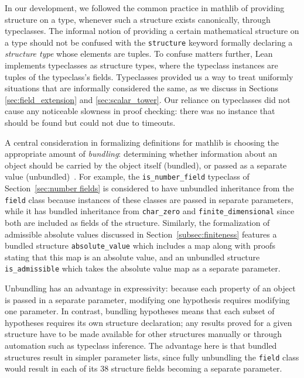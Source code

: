 \documentclass[sn-mathphys]{sn-jnl}%
\newcommand{\lean}[1]{\texttt{#1}\xspace}
\newcommand{\mathlib}{\textsf{mathlib}\xspace}
\begin{document}
In our development, we followed the common practice in \mathlib of providing structure on a type,
whenever such a structure exists canonically, through typeclasses.
The informal notion of providing a certain mathematical structure on a type should not be confused with the \lean{structure} keyword formally declaring a \emph{structure type} whose elements are tuples.
To confuse matters further, Lean implements typeclasses as structure types, where the typeclass instances are tuples of the typeclass's fields.
Typeclasses provided us a way to treat uniformly situations that are informally considered the same, as we discuss in Sections \ref{sec:field_extension} and \ref{sec:scalar_tower}.
Our reliance on typeclasses did not cause any noticeable slowness in proof checking:
there was no instance that should be found but could not due to timeouts.

A central consideration in formalizing definitions for \mathlib is choosing the appropriate amount of \emph{bundling}:
determining whether information about an object should be carried by the object itself (bundled), or passed as a separate value (unbundled)~\cite{instance-parameters-mathlib}.
For example, the \lean{is\_number\_field} typeclass of Section~\ref{sec:number fields} is considered to have unbundled inheritance from the \lean{field} class because instances of these classes are passed in separate parameters,
while it has bundled inheritance from \lean{char\_zero} and \lean{finite\_dimensional} since both are included as fields of the structure.
Similarly, the formalization of admissible absolute values discussed in Section~\ref{subsec:finiteness} features a bundled structure \lean{absolute\_value} which includes a map along with proofs stating that this map is an absolute value,
and an unbundled structure \lean{is\_admissible} which takes the absolute value map as a separate parameter.

Unbundling has an advantage in expressivity: because each property of an object is passed in a separate parameter,
modifying one hypothesis requires modifying one parameter.
In contrast, bundling hypotheses means that each subset of hypotheses requires its own structure declaration;
any results proved for a given structure have to be made available for other structures manually or through automation such as typeclass inference.
The advantage here is that bundled structures result in simpler parameter lists, since fully unbundling the \lstinline{field} class would result in each of its 38 structure fields becoming a separate parameter.
\end{document}
